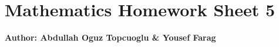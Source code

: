 \documentclass{article}
\begin{document}
\section*{\huge Mathematics Homework Sheet 5}
\begin{flushright}
   \textbf{Author: Abdullah Oguz Topcuoglu \& Yousef Farag}
\end{flushright}
\end{document}
